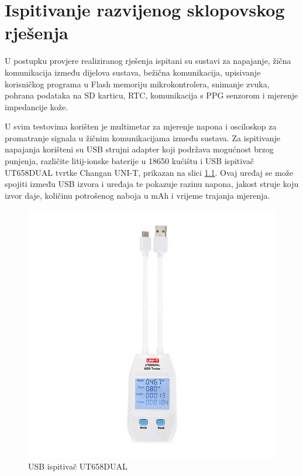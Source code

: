\chapter{Ispitivanje razvijenog sklopovskog rješenja}
U postupku provjere realiziranog rješenja ispitani su sustavi za napajanje, žična komunikacija između dijelova sustava, bežična komunikacija, upisivanje korisničkog programa u Flash memoriju mikrokontrolera, snimanje zvuka, pohrana podataka na SD karticu, RTC, komunikacija s PPG senzorom i mjerenje impedancije kože.

U svim testovima korišten je multimetar za mjerenje napona i osciloskop za promatranje signala u žičnim komunikacijama između sustava. Za ispitivanje napajanja korišteni su USB strujni adapter koji podržava mogućnost brzog punjenja, različite litij-ionske baterije u 18650 kućištu i USB ispitivač UT658DUAL tvrtke Changan UNI-T, prikazan na slici \ref{slk:UT658DUAL}. Ovaj uređaj se može spojiti između USB izvora i uređaja te pokazuje razinu napona, jakost struje koju izvor daje, količinu potrošenog naboja u mAh i vrijeme trajanja mjerenja.
\begin{figure}[htb]
    \centering
    \includegraphics[width=6 cm]{Figures/UT658DUAL.png}
    \caption{USB ispitivač UT658DUAL \cite{tester}}
    \label{slk:UT658DUAL}
\end{figure}
